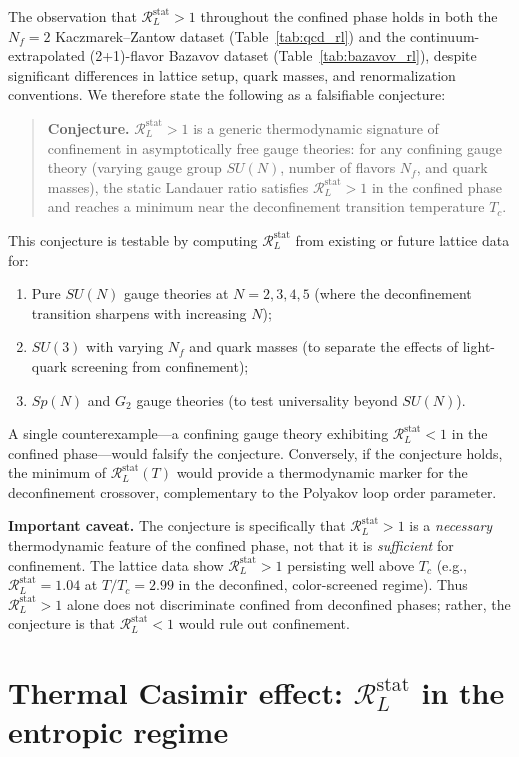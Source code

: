 \documentclass[%
 aip,
 amsmath,amssymb,
 reprint,%
]{revtex4-2}
\newcommand{\RLs}{\mathcal{R}_L^{\mathrm{stat}}}
\begin{document}
The observation that $\RLs > 1$ throughout the confined phase
holds in both the $N_f = 2$ Kaczmarek--Zantow dataset
(Table~\ref{tab:qcd_rl}) and the continuum-extrapolated
(2+1)-flavor Bazavov dataset (Table~\ref{tab:bazavov_rl}),
despite significant differences in lattice setup, quark masses,
and renormalization conventions.  We therefore state the following
as a falsifiable conjecture:

\begin{quote}
\textbf{Conjecture.}
$\RLs > 1$ is a generic thermodynamic signature of confinement
in asymptotically free gauge theories: for any confining gauge
theory (varying gauge group $SU(N)$, number of flavors $N_f$,
and quark masses), the static Landauer ratio satisfies
$\RLs > 1$ in the confined phase and reaches a minimum near
the deconfinement transition temperature $T_c$.
\end{quote}

This conjecture is testable by computing $\RLs$ from existing
or future lattice data for:
\begin{enumerate}
\item Pure $SU(N)$ gauge theories at $N = 2, 3, 4, 5$ (where the
deconfinement transition sharpens with increasing $N$);
\item $SU(3)$ with varying $N_f$ and quark masses (to separate
the effects of light-quark screening from confinement);
\item $Sp(N)$ and $G_2$ gauge theories (to test universality
beyond $SU(N)$).
\end{enumerate}
A single counterexample---a confining gauge theory exhibiting
$\RLs < 1$ in the confined phase---would falsify the conjecture.
Conversely, if the conjecture holds, the minimum of $\RLs(T)$
would provide a thermodynamic marker for the deconfinement
crossover, complementary to the Polyakov loop order parameter.

\textbf{Important caveat.} The conjecture is specifically that
$\RLs > 1$ is a \emph{necessary} thermodynamic feature of the
confined phase, not that it is \emph{sufficient} for confinement.
The lattice data show $\RLs > 1$ persisting well above $T_c$
(e.g., $\RLs = 1.04$ at $T/T_c = 2.99$ in the deconfined,
color-screened regime).  Thus $\RLs > 1$ alone does not
discriminate confined from deconfined phases; rather, the
conjecture is that $\RLs < 1$ would rule out confinement.


\section{Thermal Casimir effect: \texorpdfstring{$\RLs$}{RL} in the entropic regime}
\label{sec:casimir}
\end{document}
